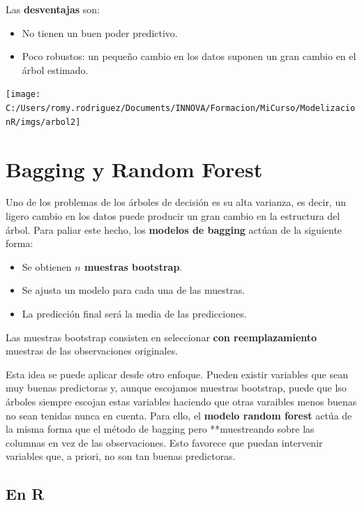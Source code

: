 \documentclass[]{book}
\providecommand{\tightlist}{%
  \setlength{\itemsep}{0pt}\setlength{\parskip}{0pt}}
\begin{document}
Las \textbf{desventajas} son:

\begin{itemize}
\tightlist
\item
  No tienen un buen poder predictivo.
\item
  Poco robustos: un pequeño cambio en los datos suponen un gran cambio en el árbol estimado.
\end{itemize}

\texttt{[image: C:/Users/romy.rodriguez/Documents/INNOVA/Formacion/MiCurso/ModelizacionR/imgs/arbol2]}

\hypertarget{bagging-y-random-forest}{%
\section{Bagging y Random Forest}\label{bagging-y-random-forest}}

Uno de los problemas de los árboles de decisión es su alta varianza, es decir, un ligero cambio en los datos puede producir un gran cambio en la estructura del árbol. Para paliar este hecho, los \textbf{modelos de bagging} actúan de la siguiente forma:

\begin{itemize}
\tightlist
\item
  Se obtienen \textbf{\(n\) muestras bootstrap}.
\item
  Se ajusta un modelo para cada una de las muestras.
\item
  La predicción final será la media de las predicciones.
\end{itemize}

Las muestras bootstrap consisten en seleccionar \textbf{con reemplazamiento} muestras de las observaciones originales.

Esta idea se puede aplicar desde otro enfoque. Pueden existir variables que sean muy buenas predictoras y, aunque escojamos muestras bootstrap, puede que lso árboles siempre escojan estas variables haciendo que otras varaibles menos buenas no sean tenidas nunca en cuenta. Para ello, el \textbf{modelo random forest} actúa de la misma forma que el método de bagging pero **muestreando sobre las columnas en vez de las observaciones. Esto favorece que puedan intervenir variables que, a priori, no son tan buenas predictoras.

\hypertarget{en-r-1}{%
\subsection{En R}\label{en-r-1}}
\end{document}
